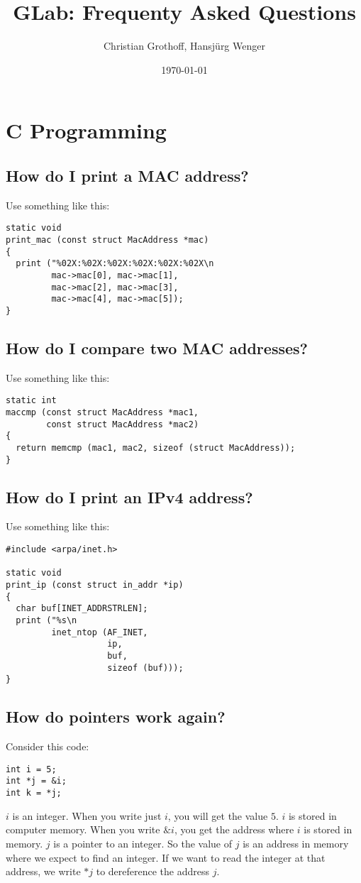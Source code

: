 \documentclass{article}
\title{GLab: Frequenty Asked Questions}
\author{Christian Grothoff, Hansjürg Wenger}
\date{\today}
\begin{document}
\maketitle


\section{C Programming}

\subsection{How do I print a MAC address?}

Use something like this:
\begin{verbatim}
static void
print_mac (const struct MacAddress *mac)
{
  print ("%02X:%02X:%02X:%02X:%02X:%02X\n
         mac->mac[0], mac->mac[1],
         mac->mac[2], mac->mac[3],
         mac->mac[4], mac->mac[5]);
}
\end{verbatim}

\subsection{How do I compare two MAC addresses?}

Use something like this:
\begin{verbatim}
static int
maccmp (const struct MacAddress *mac1,
        const struct MacAddress *mac2)
{
  return memcmp (mac1, mac2, sizeof (struct MacAddress));
}
\end{verbatim}

\subsection{How do I print an IPv4 address?}

Use something like this:
\begin{verbatim}
#include <arpa/inet.h>

static void
print_ip (const struct in_addr *ip)
{
  char buf[INET_ADDRSTRLEN];
  print ("%s\n
         inet_ntop (AF_INET,
                    ip,
                    buf,
                    sizeof (buf)));
}
\end{verbatim}


\subsection{How do pointers work again?}

Consider this code:
\begin{verbatim}
int i = 5;
int *j = &i;
int k = *j;
\end{verbatim}
$i$ is an integer. When you write just $i$, you will get the value
$5$. $i$ is stored in computer memory. When you write $\&i$, you get
the address where $i$ is stored in memory.  $j$ is a pointer to
an integer. So the value of $j$ is an address in memory where we
expect to find an integer.  If we want to read the integer at that
address, we write $*j$ to dereference the address $j$.
\end{document}
